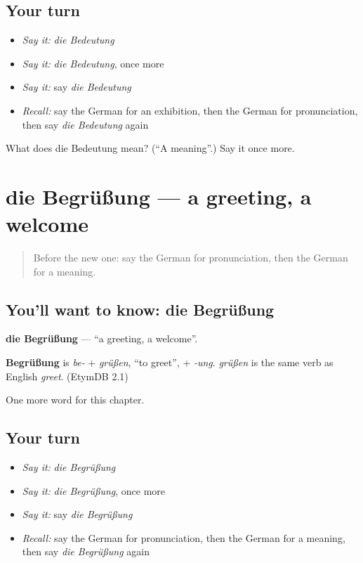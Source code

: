 \subsection*{Your turn}
\begin{itemize}
\raggedright
  \item \emph{Say it:} \emph{die Bedeutung}
  \item \emph{Say it:} \emph{die Bedeutung}, once more
  \item \emph{Say it:} say \emph{die Bedeutung}
  \item \emph{Recall:} say the German for an exhibition, then the German for pronunciation, then say \emph{die Bedeutung} again
\end{itemize}

\begin{tcolorbox}[breakable,colback=teal!4,colframe=teal!35!black,title={Before you move on}]
What does die Bedeutung mean? (\textquotedblleft{}A meaning\textquotedblright{}.) Say it once more.
\end{tcolorbox}
\section[die Begrüßung]{die Begrüßung — a greeting, a welcome}

\label{lesson:GE-C226-begruessung}



\begin{quote}
Before the new one: say the German for pronunciation, then the German for a meaning.
\end{quote}

\subsection*{You'll want to know: die Begrüßung}
\textbf{die Begrüßung} — \textquotedblleft{}a greeting, a welcome\textquotedblright{}.

\begin{cousinweb}
\textbf{Begrüßung} is \emph{be-} + \emph{grüßen}, \textquotedblleft{}to greet\textquotedblright{}, + \emph{-ung}. \emph{grüßen} is the same verb as English \emph{greet}. (EtymDB 2.1)
\end{cousinweb}

\begin{grammarlens}[title={What you've built}]
One more word for this chapter.
\end{grammarlens}

\subsection*{Your turn}
\begin{itemize}
\raggedright
  \item \emph{Say it:} \emph{die Begrüßung}
  \item \emph{Say it:} \emph{die Begrüßung}, once more
  \item \emph{Say it:} say \emph{die Begrüßung}
  \item \emph{Recall:} say the German for pronunciation, then the German for a meaning, then say \emph{die Begrüßung} again
\end{itemize}

